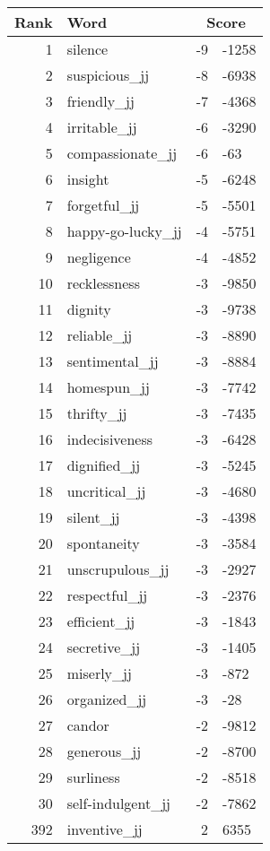 \begin{longtable}[!htbp]{| rlr@{.}l |}
    \hline
    \textbf{Rank} & \textbf{Word} & \multicolumn{2}{c|}{\textbf{Score}} \\
    \hline
    \endhead
    1 & silence & -9 & -1258 \\
    2 & suspicious\_jj & -8 & -6938 \\
    3 & friendly\_jj & -7 & -4368 \\
    4 & irritable\_jj & -6 & -3290 \\
    5 & compassionate\_jj & -6 & -63 \\
    6 & insight & -5 & -6248 \\
    7 & forgetful\_jj & -5 & -5501 \\
    8 & happy-go-lucky\_jj & -4 & -5751 \\
    9 & negligence & -4 & -4852 \\
    10 & recklessness & -3 & -9850 \\
    11 & dignity & -3 & -9738 \\
    12 & reliable\_jj & -3 & -8890 \\
    13 & sentimental\_jj & -3 & -8884 \\
    14 & homespun\_jj & -3 & -7742 \\
    15 & thrifty\_jj & -3 & -7435 \\
    16 & indecisiveness & -3 & -6428 \\
    17 & dignified\_jj & -3 & -5245 \\
    18 & uncritical\_jj & -3 & -4680 \\
    19 & silent\_jj & -3 & -4398 \\
    20 & spontaneity & -3 & -3584 \\
    21 & unscrupulous\_jj & -3 & -2927 \\
    22 & respectful\_jj & -3 & -2376 \\
    23 & efficient\_jj & -3 & -1843 \\
    24 & secretive\_jj & -3 & -1405 \\
    25 & miserly\_jj & -3 & -872 \\
    26 & organized\_jj & -3 & -28 \\
    27 & candor & -2 & -9812 \\
    28 & generous\_jj & -2 & -8700 \\
    29 & surliness & -2 & -8518 \\
    30 & self-indulgent\_jj & -2 & -7862 \\
    392 & inventive\_jj & 2 & 6355 \\

\end{longtable}
